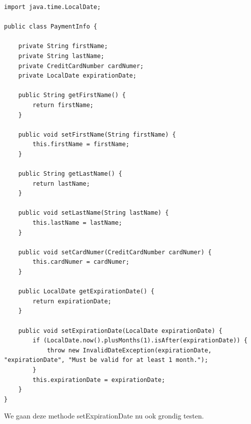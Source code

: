 \begin{lstlisting}
import java.time.LocalDate;

public class PaymentInfo {

	private String firstName;
	private String lastName;
	private CreditCardNumber cardNumer;
	private LocalDate expirationDate;

	public String getFirstName() {
		return firstName;
	}

	public void setFirstName(String firstName) {
		this.firstName = firstName;
	}

	public String getLastName() {
		return lastName;
	}

	public void setLastName(String lastName) {
		this.lastName = lastName;
	}

	public void setCardNumer(CreditCardNumber cardNumer) {
		this.cardNumer = cardNumer;
	}

	public LocalDate getExpirationDate() {
		return expirationDate;
	}

	public void setExpirationDate(LocalDate expirationDate) {
		if (LocalDate.now().plusMonths(1).isAfter(expirationDate)) {
			throw new InvalidDateException(expirationDate, "expirationDate", "Must be valid for at least 1 month.");
		}
		this.expirationDate = expirationDate;
	}
}
\end{lstlisting}

We gaan deze  methode setExpirationDate nu ook grondig testen.

